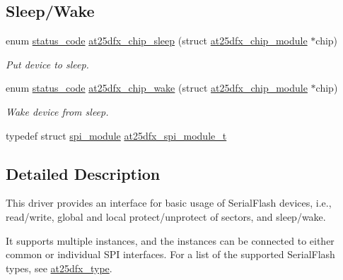 \subsection*{Sleep/\+Wake}
\begin{DoxyCompactItemize}
\item 
enum \mbox{\hyperlink{group__group__sam0__utils__status__codes_ga751c892e5a46b8e7d282085a5a5bf151}{status\+\_\+code}} \mbox{\hyperlink{group__asfdoc__common2__at25dfx__group_ga9a5ea9405eedcf45f3846b3e74f227a3}{at25dfx\+\_\+chip\+\_\+sleep}} (struct \mbox{\hyperlink{structat25dfx__chip__module}{at25dfx\+\_\+chip\+\_\+module}} $\ast$chip)
\begin{DoxyCompactList}\small\item\em Put device to sleep. \end{DoxyCompactList}\item 
enum \mbox{\hyperlink{group__group__sam0__utils__status__codes_ga751c892e5a46b8e7d282085a5a5bf151}{status\+\_\+code}} \mbox{\hyperlink{group__asfdoc__common2__at25dfx__group_ga66d2ea2176179b7e6cb06901bb2bdc05}{at25dfx\+\_\+chip\+\_\+wake}} (struct \mbox{\hyperlink{structat25dfx__chip__module}{at25dfx\+\_\+chip\+\_\+module}} $\ast$chip)
\begin{DoxyCompactList}\small\item\em Wake device from sleep. \end{DoxyCompactList}\end{DoxyCompactItemize}
\begin{DoxyCompactItemize}
\item 
typedef struct \mbox{\hyperlink{structspi__module}{spi\+\_\+module}} \mbox{\hyperlink{group__asfdoc__common2__at25dfx__group_ga78981ccb6b863d6548f343fe01792406}{at25dfx\+\_\+spi\+\_\+module\+\_\+t}}
\end{DoxyCompactItemize}


\subsection{Detailed Description}
This driver provides an interface for basic usage of Serial\+Flash devices, i.\+e., read/write, global and local protect/unprotect of sectors, and sleep/wake.

It supports multiple instances, and the instances can be connected to either common or individual S\+PI interfaces. For a list of the supported Serial\+Flash types, see \mbox{\hyperlink{group__asfdoc__common2__at25dfx__group_ga98ba30dd90f741beb7f8d47e7725471d}{at25dfx\+\_\+type}}.

